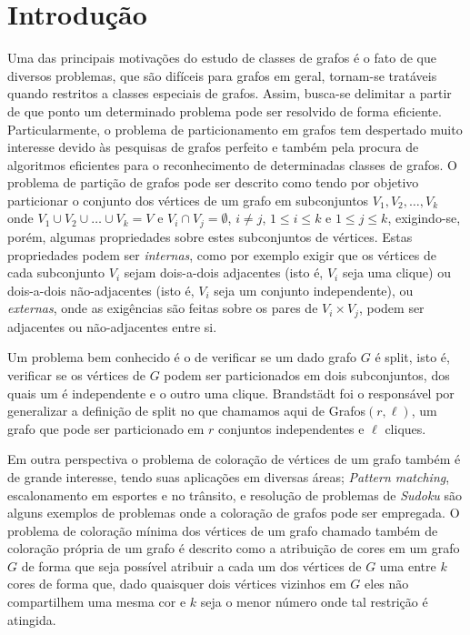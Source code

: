 \chapter{Introdução} \label{cap:intro}

Uma das principais motivações do estudo de classes de grafos é o fato de que diversos problemas, que são difíceis para grafos em geral, tornam-se tratáveis quando restritos a classes especiais de grafos. Assim, busca-se delimitar a partir de que ponto um determinado problema pode ser resolvido de forma eficiente. 
Particularmente, o problema de particionamento em grafos tem despertado muito interesse devido às pesquisas de grafos perfeito e também pela procura de algoritmos eficientes para o reconhecimento de determinadas classes de grafos.
O problema de partição de grafos pode ser descrito como tendo por objetivo particionar o conjunto dos vértices de um grafo em subconjuntos $V_1,V_2, 
\ldots, V_k$ onde $V_1 \cup V_2 \cup \ldots \cup V_k = V$ e $V_i \cap V_j = \emptyset$, $i \neq j$, $1 \leq i \leq k$ e $1 \leq j \leq k$, exigindo-se, porém, algumas propriedades sobre estes subconjuntos de vértices. Estas propriedades podem ser \textit{internas}, como por exemplo exigir que os vértices de cada subconjunto $V_i$ sejam dois-a-dois adjacentes (isto é, $V_i$ seja uma clique) ou dois-a-dois não-adjacentes (isto é, $V_i$ seja um conjunto independente), ou \textit{externas}, onde as exigências são feitas sobre os pares de $V_i\times V_j$, podem ser adjacentes ou não-adjacentes entre si. 

Um problema bem conhecido é o de verificar se um dado grafo $G$ é split, isto é, verificar se os vértices de $G$ podem ser particionados em dois subconjuntos, dos quais um é independente e o outro uma clique. Brandstädt foi o responsável por generalizar a definição de split no que chamamos aqui de Grafos$(r,\ell)$, um grafo que pode ser particionado em $r$ conjuntos independentes e $\ell$ cliques.

Em outra perspectiva o problema de coloração de vértices de um grafo também é de grande interesse, tendo suas aplicações em diversas áreas; \emph{Pattern matching}, escalonamento em esportes e no trânsito, e resolução de problemas de \emph{Sudoku} são alguns exemplos de problemas onde a coloração de grafos pode ser empregada\cite{lewis15}. O problema de coloração mínima dos vértices de um grafo chamado também de coloração própria de um grafo é descrito como a atribuição de cores em um grafo $G$ de forma que seja possível atribuir a cada um dos vértices de $G$ uma entre $k$ cores de forma que, dado quaisquer dois vértices vizinhos em $G$ eles não compartilhem uma mesma cor e $k$ seja o menor número onde tal restrição é atingida.



